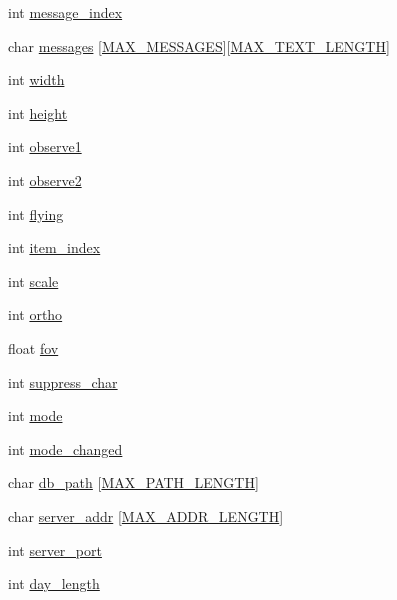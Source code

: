 \begin{DoxyCompactItemize}
\item 
int \hyperlink{structModel_a5026500a00cac3bb98dd3a2085802fa8}{message\+\_\+index}
\item 
char \hyperlink{structModel_aa623ba15ac148da584c8cc1b7a76b7e9}{messages} \mbox{[}\hyperlink{config_8h_a1f02f60afb419aa25921dcd8ae49f807}{M\+A\+X\+\_\+\+M\+E\+S\+S\+A\+G\+ES}\mbox{]}\mbox{[}\hyperlink{main_8c_a9a90baeac9b3273d185357200b599b39}{M\+A\+X\+\_\+\+T\+E\+X\+T\+\_\+\+L\+E\+N\+G\+TH}\mbox{]}
\item 
int \hyperlink{structModel_a95fedd30937f05f07f81b7fa3aa29add}{width}
\item 
int \hyperlink{structModel_a710c2d2f710d349e4a76c7d78570e70f}{height}
\item 
int \hyperlink{structModel_a3890d0a201c0de9b06065e1166c392bb}{observe1}
\item 
int \hyperlink{structModel_a988b3760efa4ed902d218637fb19152e}{observe2}
\item 
int \hyperlink{structModel_a5c6ca81f5d80886495091479812321f0}{flying}
\item 
int \hyperlink{structModel_a4ae976c019c23dff2d52f7fc89c6c0d0}{item\+\_\+index}
\item 
int \hyperlink{structModel_a2e5100141918bee00883703185ed79cd}{scale}
\item 
int \hyperlink{structModel_a9ce317de5c55c344b1ce279b0223941f}{ortho}
\item 
float \hyperlink{structModel_ac42baa2c90d6e01bef3680719f59e905}{fov}
\item 
int \hyperlink{structModel_a71a28fca3a64903ea725641e4f63030b}{suppress\+\_\+char}
\item 
int \hyperlink{structModel_add046a4b0c100fba89780214f96c02ba}{mode}
\item 
int \hyperlink{structModel_a6540d35023bbfc1bae76c2932a9efe2b}{mode\+\_\+changed}
\item 
char \hyperlink{structModel_af802d2f02b947ba1772707eb247f8dac}{db\+\_\+path} \mbox{[}\hyperlink{main_8c_a9eb6992d76f02128388ae95c0415604a}{M\+A\+X\+\_\+\+P\+A\+T\+H\+\_\+\+L\+E\+N\+G\+TH}\mbox{]}
\item 
char \hyperlink{structModel_a945af3964810abe23abf7324a3da1b35}{server\+\_\+addr} \mbox{[}\hyperlink{main_8c_af5116a516a99d43d46a02f4b59763da7}{M\+A\+X\+\_\+\+A\+D\+D\+R\+\_\+\+L\+E\+N\+G\+TH}\mbox{]}
\item 
int \hyperlink{structModel_ac47fe750112140fe346c32524bf1121b}{server\+\_\+port}
\item 
int \hyperlink{structModel_afd79a77cf19803921e2c10984ec9af52}{day\+\_\+length}

\end{DoxyCompactItemize}
